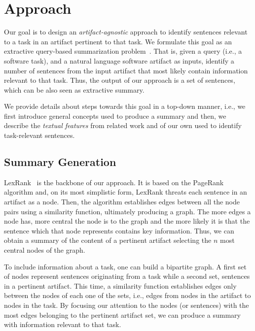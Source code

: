\section{Approach}
\label{cp5:approaches}


Our goal is to design an \textit{artifact-agnostic} approach
to identify sentences relevant to a task in an artifact pertinent to that task.
We formulate this goal as an extractive query-based summarization problem~\cite{Goldsteinet1999}.
That is, given a query (i.e., a software task),
and a natural language software artifact as inputs,
identify a number of sentences from the input artifact that
most likely contain information relevant to that task. 
Thus, the output of our approach is a set of sentences,
which can  be also seen as extractive summary.



We provide details about steps towards this goal
in a top-down manner, i.e., we first introduce general concepts
used to produce a summary and then, we describe
the \textit{textual features} from related work and of our own used to identify task-relevant sentences.




\subsection{Summary Generation}


LexRank~\cite{Erkan2004} is the backbone of our approach. 
It is based on the PageRank~\cite{Page1999} algorithm
and, on its most simplistic form, LexRank threats each sentence in an artifact as a node.
Then, the algorithm
establishes edges between all the node pairs using a similarity function, ultimately producing a graph. 
The more edges a node has, more central the node is to the graph and the more likely it is that the sentence 
which that node represents contains key information. 
Thus, we can obtain a summary of the content of a pertinent artifact selecting the $n$ most central nodes of the graph. 


To include information about a task, one can build a bipartite graph.
A first set of nodes represent sentences originating from a task while a second set, sentences in a pertinent artifact.
This time,  a similarity function 
establishes edges only  between the nodes of each one of the sets, i.e., edges from nodes in the artifact to nodes in the task.
By focusing our attention to the nodes (or sentences) with the most edges belonging to the pertinent artifact set, we can produce a summary with information relevant to that task.




